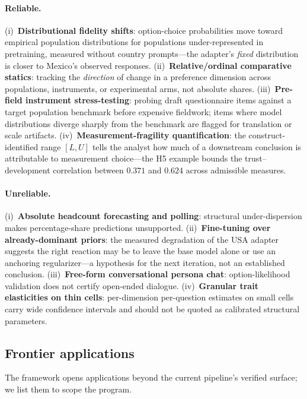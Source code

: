 \documentclass[11pt,letterpaper]{article}
\begin{document}
\paragraph{Reliable.}
(i)~\textbf{Distributional fidelity shifts}: option-choice probabilities move toward empirical population distributions for populations under-represented in pretraining, measured without country prompts---the adapter's \emph{fixed} distribution is closer to Mexico's observed responses. (ii)~\textbf{Relative/ordinal comparative statics}: tracking the \emph{direction} of change in a preference dimension across populations, instruments, or experimental arms, not absolute shares. (iii)~\textbf{Pre-field instrument stress-testing}: probing draft questionnaire items against a target population benchmark before expensive fieldwork; items where model distributions diverge sharply from the benchmark are flagged for translation or scale artifacts. (iv)~\textbf{Measurement-fragility quantification}: the construct-identified range $[L,U]$ tells the analyst how much of a downstream conclusion is attributable to measurement choice---the H5 example bounds the trust--development correlation between $0.371$ and $0.624$ across admissible measures.

\paragraph{Unreliable.}
(i)~\textbf{Absolute headcount forecasting and polling}: structural under-dispersion makes percentage-share predictions unsupported. (ii)~\textbf{Fine-tuning over already-dominant priors}: the measured degradation of the USA adapter suggests the right reaction may be to leave the base model alone or use an anchoring regularizer---a hypothesis for the next iteration, not an established conclusion. (iii)~\textbf{Free-form conversational persona chat}: option-likelihood validation does not certify open-ended dialogue. (iv)~\textbf{Granular trait elasticities on thin cells}: per-dimension per-question estimates on small cells carry wide confidence intervals and should not be quoted as calibrated structural parameters.

\subsection{Frontier applications}

The framework opens applications beyond the current pipeline's verified surface; we list them to scope the program.
\end{document}
